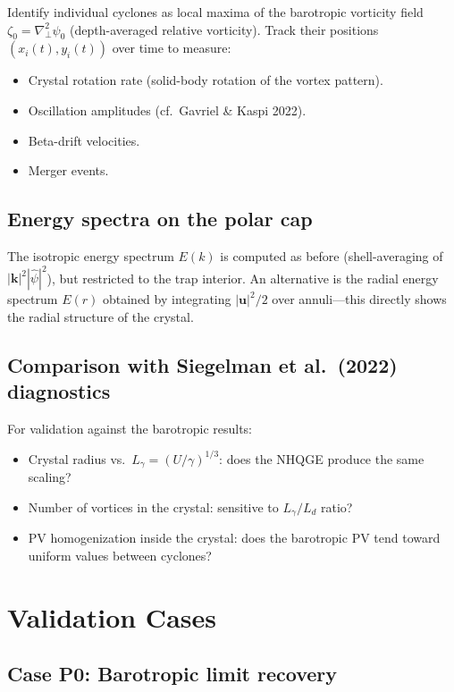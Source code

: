 \documentclass[11pt]{article}
\newcommand{\Ld}{L_d}
\newcommand{\kh}{|\bm{k}|}
\newcommand{\hhat}[1]{\widehat{#1}}
\begin{document}
Identify individual cyclones as local maxima of the barotropic vorticity field $\zeta_0 = \nabla_\perp^2\psi_0$ (depth-averaged relative vorticity). Track their positions $(x_i(t), y_i(t))$ over time to measure:
\begin{itemize}[nosep]
\item Crystal rotation rate (solid-body rotation of the vortex pattern).
\item Oscillation amplitudes (cf.\ Gavriel \& Kaspi 2022).
\item Beta-drift velocities.
\item Merger events.
\end{itemize}

\subsection{Energy spectra on the polar cap}

The isotropic energy spectrum $E(k)$ is computed as before (shell-averaging of $\kh^2|\hhat\psi|^2$), but restricted to the trap interior. An alternative is the radial energy spectrum $E(r)$ obtained by integrating $|\bm{u}|^2/2$ over annuli---this directly shows the radial structure of the crystal.

\subsection{Comparison with Siegelman et al.\ (2022) diagnostics}

For validation against the barotropic results:
\begin{itemize}[nosep]
\item Crystal radius vs.\ $L_\gamma = (U/\gamma)^{1/3}$: does the NHQGE produce the same scaling?
\item Number of vortices in the crystal: sensitive to $L_\gamma / \Ld$ ratio?
\item PV homogenization inside the crystal: does the barotropic PV tend toward uniform values between cyclones?
\end{itemize}


\section{Validation Cases}
\label{sec:validation}

\subsection{Case P0: Barotropic limit recovery}
\end{document}
